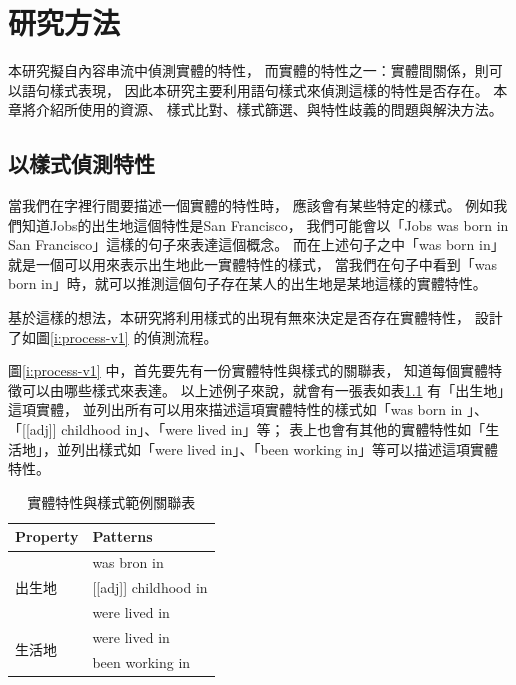%
%
%
\chapter{研究方法}
\label{c:method}

本研究擬自內容串流中偵測實體的特性，
而實體的特性之一：實體間關係，則可以語句樣式表現，
因此本研究主要利用語句樣式來偵測這樣的特性是否存在。
本章將介紹所使用的資源、
樣式比對、樣式篩選、與特性歧義的問題與解決方法。

\section{以樣式偵測特性}
當我們在字裡行間要描述一個實體的特性時，
應該會有某些特定的樣式。
例如我們知道Jobs的出生地這個特性是San Francisco，
我們可能會以「Jobs was born in San Francisco」這樣的句子來表達這個概念。
而在上述句子之中「was born in」就是一個可以用來表示出生地此一實體特性的樣式，
當我們在句子中看到「was born in」時，就可以推測這個句子存在某人的出生地是某地這樣的實體特性。

基於這樣的想法，本研究將利用樣式的出現有無來決定是否存在實體特性，
設計了如圖\ref{i:process-v1} 的偵測流程。

圖\ref{i:process-v1} 中，首先要先有一份實體特性與樣式的關聯表，
知道每個實體特徵可以由哪些樣式來表達。
以上述例子來說，就會有一張表如表\ref{t:ex-ptn-table} 有「出生地」這項實體，
並列出所有可以用來描述這項實體特性的樣式如「was born in 」、「[[adj]] childhood in」、「were lived in」等；
表上也會有其他的實體特性如「生活地」，並列出樣式如「were lived in」、「been working in」等可以描述這項實體特性。

\begin{table}
    \centering
    \footnotesize
    \begin{tabular}{|l|l|}
        \hline
        Property & Patterns \\
        \hline
        \multirow{3}{*}{出生地} & was bron in \\
         & [[adj]] childhood in \\
         & were lived in \\
        \hline
        \multirow{2}{*}{生活地} & were lived in \\
         & been working in \\
        \hline
    \end{tabular}
    \caption{實體特性與樣式範例關聯表}
    \label{t:ex-ptn-table}
\end{table}

